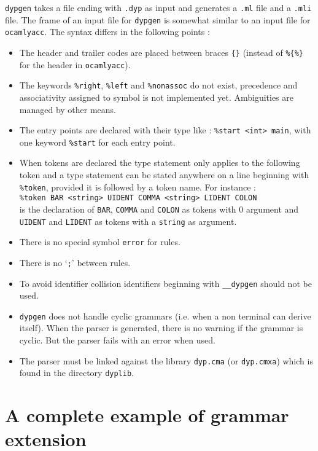 \documentclass[12pt]{article}
\begin{document}
{\texttt{dypgen} takes a file ending with \texttt{.dyp} as input and generates a \texttt{.ml} file and a \texttt{.mli} file. The frame of an input file for \texttt{dypgen} is somewhat similar to an input file for \texttt{ocamlyacc}. The syntax differs in the following points :
\begin{itemize}
\item The header and trailer codes are placed between braces \texttt{\{\}} (instead of \texttt{\%\{\%\}} for the header in \texttt{ocamlyacc}).
\item The keywords \texttt{\%right}, \texttt{\%left} and \texttt{\%nonassoc} do not exist, precedence and associativity assigned to symbol is not implemented yet. Ambiguities are managed by other means.
\item The entry points are declared with their type like : \texttt{\%start <int> main}, with one keyword \texttt{\%start} for each entry point.
\item When tokens are declared the type statement only applies to the following token and a type statement can be stated anywhere on a line beginning with \texttt{\%token}, provided it is followed by a token name. For instance :\\
\texttt{\%token BAR <string> UIDENT COMMA <string> LIDENT COLON}\\
is the declaration of \texttt{BAR}, \texttt{COMMA} and \texttt{COLON} as tokens with 0 argument and \texttt{UIDENT} and \texttt{LIDENT} as tokens with a \texttt{string} as argument.
\item There is no special symbol \texttt{error} for rules.
\item There is no `\texttt{;}' between rules.
\item To avoid identifier collision identifiers beginning with \texttt{\_\_dypgen} should not be used.
\item \texttt{dypgen} does not handle cyclic grammars (i.e. when a non terminal can derive itself). When the parser is generated, there is no warning if the grammar is cyclic. But the parser fails with an error when used.
\item The parser must be linked against the library \texttt{dyp.cma} (or \texttt{dyp.cmxa}) which is found in the directory \texttt{dyplib}.
\end{itemize}

\section{A complete example of grammar extension}\label{complete example}

}
\end{document}
